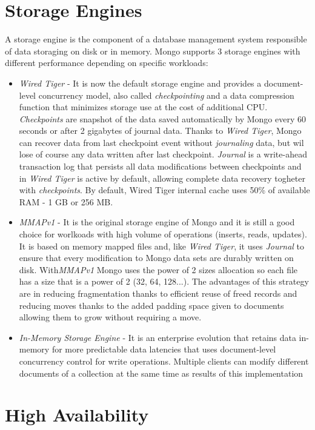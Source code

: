 \section{Storage Engines}
\label{sec:4}
A storage engine is the component of a database management system responsible of data storaging on disk or in memory. Mongo supports 3 storage engines with different performance depending on specific workloads:
\begin{itemize}
	\item \textit{Wired Tiger} - It is now the default storage engine and provides a document-level concurrency model, also called \textit{checkpointing} and a data compression function that minimizes storage use at the cost of additional CPU.
\textit{Checkpoints} are snapshot of the data saved automatically by Mongo every 60 seconds or after 2 gigabytes of journal data. Thanks to \textit{Wired Tiger}, Mongo can recover data from last checkpoint event without \textit{journaling} data, but wil lose of course any data written after last checkpoint.
\textit{Journal} is a write-ahead transaction log that persists all data modifications between checkpoints and in \textit{Wired Tiger} is active by default, allowing complete data recovery togheter with \textit{checkpoints}.
By default, Wired Tiger internal cache uses 50\% of available RAM - 1 GB or 256 MB.
	\item \textit{MMAPv1} - It is  the original storage engine of Mongo and it is still a good choice for worlkoads with high volume of operations (inserts, reads, updates). It is based on memory mapped files and, like \textit{Wired Tiger}, it uses \textit{Journal} to ensure that every modification  to Mongo data sets are durably written on disk.
With\textit{MMAPv1} Mongo uses the power of 2 sizes allocation so each file has a size that is a power of 2 (32, 64, 128...). The advantages of this strategy are in reducing fragmentation thanks to efficient reuse of freed records and reducing moves thanks to the added padding space given to documents allowing them to grow without requiring a move.
	\item \textit{In-Memory Storage Engine} - It is an enterprise evolution that retains data in-memory for more predictable data latencies that uses document-level concurrency control for write operations. Multiple clients can modify different documents of a collection at the same time as results of this implementation
\end{itemize}

\section{High Availability}
\label{sec:5}


